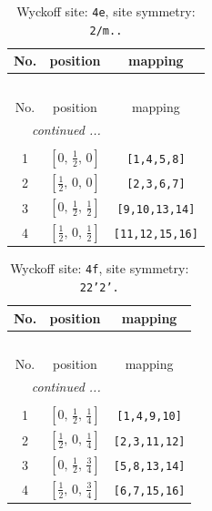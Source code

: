\documentclass[fleqn,8pt]{jsarticle}
\begin{document}
\begin{longtable}{ccc}
\caption{Wyckoff site: {\tt 4e}, site symmetry: {\tt 2/m..}}
 \\
 \hline \hline
No. & position & mapping \\ \hline \endfirsthead

\multicolumn{2}{l}{\tablename\ \thetable{}} \\
 \hline \hline
No. & position & mapping \\ \hline \endhead

 \hline \hline
\multicolumn{2}{r}{\footnotesize\it continued ...} \\ \endfoot

 \hline \hline
\multicolumn{2}{r}{} \\ \endlastfoot

1 & $\left[ 0,\, \frac{1}{2},\, 0 \right]$ & {\tt [1,4,5,8]} \\ \hline
2 & $\left[ \frac{1}{2},\, 0,\, 0 \right]$ & {\tt [2,3,6,7]} \\ \hline
3 & $\left[ 0,\, \frac{1}{2},\, \frac{1}{2} \right]$ & {\tt [9,10,13,14]} \\ \hline
4 & $\left[ \frac{1}{2},\, 0,\, \frac{1}{2} \right]$ & {\tt [11,12,15,16]} \\
\end{longtable}
\renewcommand{\arraystretch}{1.2}
\begin{longtable}{ccc}
\caption{Wyckoff site: {\tt 4f}, site symmetry: {\tt 22'2'.}}
 \\
 \hline \hline
No. & position & mapping \\ \hline \endfirsthead

\multicolumn{2}{l}{\tablename\ \thetable{}} \\
 \hline \hline
No. & position & mapping \\ \hline \endhead

 \hline \hline
\multicolumn{2}{r}{\footnotesize\it continued ...} \\ \endfoot

 \hline \hline
\multicolumn{2}{r}{} \\ \endlastfoot

1 & $\left[ 0,\, \frac{1}{2},\, \frac{1}{4} \right]$ & {\tt [1,4,9,10]} \\ \hline
2 & $\left[ \frac{1}{2},\, 0,\, \frac{1}{4} \right]$ & {\tt [2,3,11,12]} \\ \hline
3 & $\left[ 0,\, \frac{1}{2},\, \frac{3}{4} \right]$ & {\tt [5,8,13,14]} \\ \hline
4 & $\left[ \frac{1}{2},\, 0,\, \frac{3}{4} \right]$ & {\tt [6,7,15,16]} \\
\end{longtable}
\end{document}
